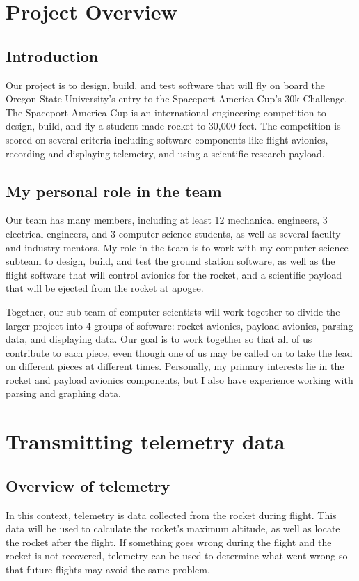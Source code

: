 \documentclass[onecolumn, draftclsnofoot, 10pt, compsoc]{IEEEtran}
\begin{document}
\tableofcontents
\section{Project Overview}
\subsection{Introduction}
Our project is to design, build, and test software that will fly on board the Oregon State University's entry to the Spaceport America Cup's 30k Challenge.  The Spaceport America Cup is an international engineering competition to design, build, and fly a student-made rocket to 30,000 feet.  The competition is scored on several criteria including software components like flight avionics, recording and displaying telemetry, and using a scientific research payload.

\subsection{My personal role in the team}
Our team has many members, including at least 12 mechanical engineers, 3 electrical engineers, and 3 computer science students, as well as several faculty and industry mentors.  My role in the team is to work with my computer science subteam to design, build, and test the ground station software, as well as the flight software that will control avionics for the rocket, and a scientific payload that will be ejected from the rocket at apogee.

Together, our sub team of computer scientists will work together to divide the larger project into 4 groups of software: rocket avionics, payload avionics, parsing data, and displaying data.  Our goal is to work together so that all of us contribute to each piece, even though one of us may be called on to take the lead on different pieces at different times.  Personally, my primary interests lie in the rocket and payload avionics components, but I also have experience working with parsing and graphing data.

\section{Transmitting telemetry data}

\subsection{Overview of telemetry}
In this context, telemetry is data collected from the rocket during flight.  This data will be used to calculate the rocket's maximum altitude, as well as locate the rocket after the flight.  If something goes wrong during the flight and the rocket is not recovered, telemetry can be used to determine what went wrong so that future flights may avoid the same problem.
\end{document}
